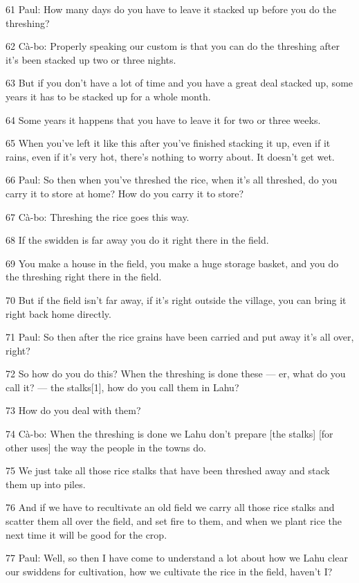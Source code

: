 {61 Paul: How many days do you have to leave it stacked up before you do
the threshing?}

{62 Cà-bo: Properly speaking our custom is that you can do the threshing
after it's been stacked up two or three nights.}

{63 But if you don't have a lot of time and you have a great deal stacked
up, some years it has to be stacked up for a whole month.}

{64 Some years it happens that you have to leave it for two or three weeks.}

{65 When you've left it like this after you've finished stacking it up,
even if it rains, even if it's very hot, there's nothing to worry about. It doesn't
get wet.}

{66 Paul: So then when you've threshed the rice, when it's all threshed,
do you carry it to store at home? How do you carry it to store?}

{67 Cà-bo: Threshing the rice goes this way.}

{68 If the swidden is far away you do it right there in the field.}

{69 You make a house in the field, you make a huge storage basket, and you
do the threshing right there in the field.}

{70 But if the field isn't far away, if it's right outside the village,
you can bring it right back home directly.}

{71 Paul: So then after the rice grains have been carried and put away it's
all over, right?}

{72 So how do you do this? When the threshing is done these --- er, what
do you call it? --- the stalks[1], how do you call them in Lahu?}

{73 How do you deal with them?}

{74 Cà-bo: When the threshing is done we Lahu don't prepare [the stalks]
[for other uses] the way the people in the towns do.}

{75 We just take all those rice stalks that have been threshed away and
stack them up into piles.}

{76 And if we have to recultivate an old field we carry all those rice stalks
and scatter them all over the field, and set fire to them, and when we plant rice
the next time it will be good for the crop.}

{77 Paul: Well, so then I have come to understand a lot about how we Lahu
clear our swiddens for cultivation, how we cultivate the rice in the field, haven't
I?}

